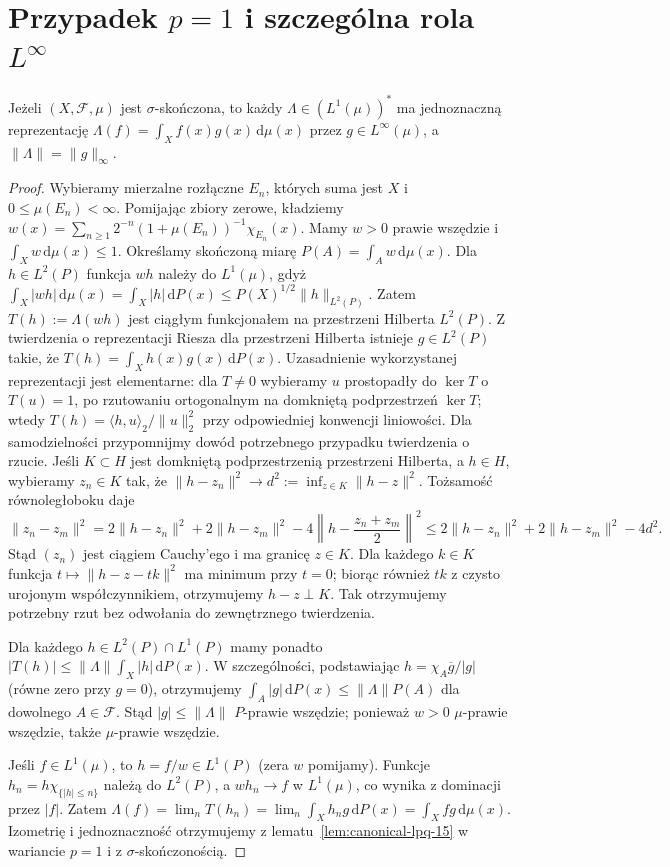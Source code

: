 \section{Przypadek $p=1$ i szczególna rola $L^\infty$}
\begin{twierdzenie}
\label{thm:dual-l1-15}
Jeżeli $(X,\mathcal F,\mu)$ jest $\sigma$-skończona, to
każdy $\Lambda\in(L^1(\mu))^*$ ma jednoznaczną reprezentację
$\Lambda(f)=\int_X f(x)g(x)\,\mathrm d\mu(x)$
przez $g\in L^\infty(\mu)$, a $\|\Lambda\|=\|g\|_\infty$.
\end{twierdzenie}
\begin{proof}
Wybieramy mierzalne rozłączne $E_n$, których suma jest $X$
i $0\le\mu(E_n)<\infty$. Pomijając zbiory zerowe, kładziemy
$w(x)=\sum_{n\ge1}2^{-n}(1+\mu(E_n))^{-1}\chi_{E_n}(x)$.
Mamy $w>0$ prawie wszędzie i $\int_Xw\,\mathrm d\mu(x)\le1$.
Określamy skończoną miarę $P(A)=\int_Aw\,\mathrm d\mu(x)$.
Dla $h\in L^2(P)$ funkcja $wh$ należy do $L^1(\mu)$, gdyż
$\int_X|wh|\,\mathrm d\mu(x)=\int_X|h|\,\mathrm dP(x)
\le P(X)^{1/2}\|h\|_{L^2(P)}$. Zatem
$T(h):=\Lambda(wh)$ jest ciągłym funkcjonałem na
przestrzeni Hilberta $L^2(P)$. Z twierdzenia o reprezentacji
Riesza dla przestrzeni Hilberta istnieje $g\in L^2(P)$
takie, że $T(h)=\int_X h(x)g(x)\,\mathrm dP(x)$.
Uzasadnienie wykorzystanej reprezentacji jest elementarne:
dla $T\ne0$ wybieramy $u$ prostopadły do $\ker T$ o
$T(u)=1$, po rzutowaniu ortogonalnym na domkniętą
podprzestrzeń $\ker T$; wtedy
$T(h)=\langle h,u\rangle_2/\|u\|_2^2$ przy odpowiedniej
konwencji liniowości. Dla samodzielności przypomnijmy dowód potrzebnego
przypadku twierdzenia o rzucie. Jeśli $K\subset H$ jest
domkniętą podprzestrzenią przestrzeni Hilberta,
a $h\in H$, wybieramy $z_n\in K$ tak, że
$\|h-z_n\|^2\to d^2:=\inf_{z\in K}\|h-z\|^2$.
Tożsamość równoległoboku daje
\[
\|z_n-z_m\|^2
=2\|h-z_n\|^2+2\|h-z_m\|^2
-4\left\|h-\frac{z_n+z_m}{2}\right\|^2
\le2\|h-z_n\|^2+2\|h-z_m\|^2-4d^2.
\]
Stąd $(z_n)$ jest ciągiem Cauchy'ego i ma granicę
$z\in K$. Dla każdego $k\in K$ funkcja
$t\mapsto\|h-z-tk\|^2$ ma minimum przy $t=0$;
biorąc również $tk$ z czysto urojonym współczynnikiem,
otrzymujemy $h-z\perp K$. Tak otrzymujemy potrzebny rzut
bez odwołania do zewnętrznego twierdzenia.

Dla każdego $h\in L^2(P)\cap L^1(P)$ mamy ponadto
$|T(h)|\le\|\Lambda\|\int_X|h|\,\mathrm dP(x)$.
W szczególności, podstawiając
$h=\chi_A\overline g/|g|$ (równe zero przy $g=0$),
otrzymujemy
$\int_A|g|\,\mathrm dP(x)\le\|\Lambda\|P(A)$
dla dowolnego $A\in\mathcal F$. Stąd
$|g|\le\|\Lambda\|$ $P$-prawie wszędzie; ponieważ
$w>0$ $\mu$-prawie wszędzie, także $\mu$-prawie wszędzie.

Jeśli $f\in L^1(\mu)$, to $h=f/w\in L^1(P)$
(zera $w$ pomijamy). Funkcje
$h_n=h\chi_{\{|h|\le n\}}$ należą do
$L^2(P)$, a $wh_n\to f$ w $L^1(\mu)$, co wynika
z dominacji przez $|f|$. Zatem
$\Lambda(f)=\lim_nT(h_n)=\lim_n\int_Xh_ng\,\mathrm dP(x)
=\int_Xfg\,\mathrm d\mu(x)$.
Izometrię i jednoznaczność otrzymujemy z
lematu~\ref{lem:canonical-lpq-15} w wariancie $p=1$
i z $\sigma$-skończonością.
\end{proof}


